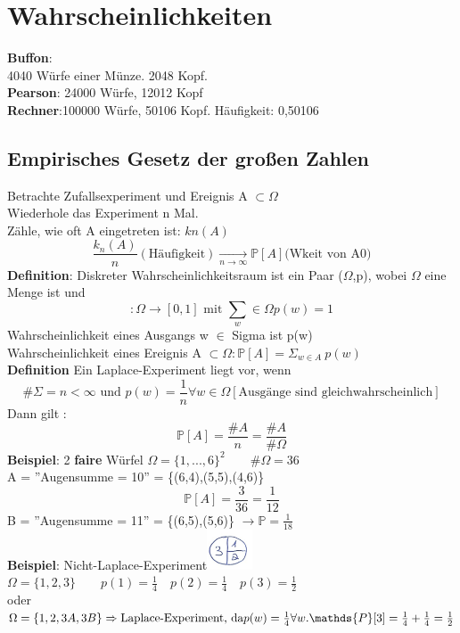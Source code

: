 \section{Wahrscheinlichkeiten}
\textbf{Buffon}:\\
4040 Würfe einer Münze. 2048 Kopf.\medskip\\
\textbf{Pearson}: 24000 Würfe, 12012 Kopf\medskip\\
\textbf{Rechner}:100000 Würfe, 50106 Kopf. Häufigkeit: 0,50106\\
\subsection{Empirisches Gesetz der großen Zahlen}
Betrachte Zufallsexperiment und Ereignis A $\subset \Omega$\\
Wiederhole das Experiment n Mal.\\
Zähle, wie oft A eingetreten ist: $kn(A)$ $$\frac{k_n(A)}{n} (\text{Häufigkeit}) \underset{n\rightarrow \infty}{\rightarrow} \mathds {P}[A] \text{(Wkeit von A0)}$$ 
\textbf{Definition}: Diskreter Wahrscheinlichkeitsraum ist ein Paar ($\Omega$,p), wobei $\Omega$ eine Menge ist und
$$:\Omega \rightarrow [0,1] \text{ mit } \sum_w\in \Omega p(w) = 1$$
Wahrscheinlichkeit eines Ausgangs w $\in$ Sigma ist p(w)\\
Wahrscheinlichkeit eines Ereignis A $\subset \Omega : \mathds {P}[A]=\Sigma_{w\in A}\:p(w)$\medskip\\
\textbf{Definition} Ein Laplace-Experiment liegt vor, wenn 
$$\#\Sigma = n < \infty \text{ und } p(w) = \frac{1}{n}\forall w \in \Omega[\text{Ausgänge sind gleichwahrscheinlich}]$$
Dann gilt : $$\mathds {P}[A]=\frac{\#A}{n}= \frac{\#A}{\#\Omega}$$
\textbf{Beispiel}: 2 \textbf{faire} Würfel $\Omega = \{1,...,6\}^2 \qquad \#\Omega = 36$\\
A = ''Augensumme  = 10'' = \{(6,4),(5,5),(4,6)\}
$$\mathds {P}[A] = \frac{3}{36}=\frac{1}{12}$$
B = ''Augensumme = 11'' = \{(6,5),(5,6)\} $\rightarrow \mathds {P}=\frac{1}{18}$\medskip\\
\textbf{Beispiel}: Nicht-Laplace-Experiment\includegraphics[width=0.1\textwidth]{img/torte.PNG}\\
$\Omega = \{1,2,3\} \qquad p(1) = \frac{1}{4} \quad p(2)=\frac{1}{4} \quad p(3) = \frac{1}{2}$\\oder
$\Omega = \{1,2,3A,3B\} \Rightarrow \text{Laplace-Experiment, da} \\ p(w) = \frac{1}{4} \forall w. \mathds {P}[3] = \frac{1}{4}+\frac{1}{4} = \frac{1}{2}$\medskip\\

